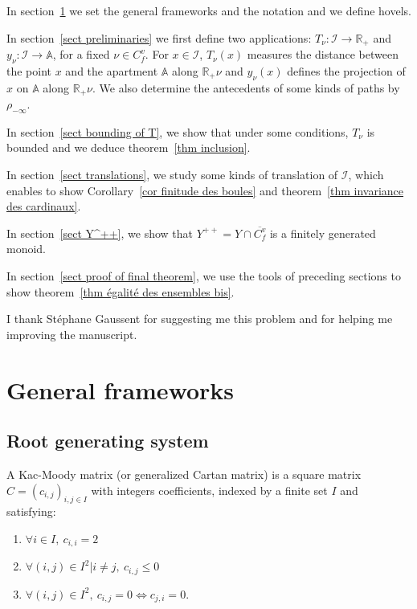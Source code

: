 \documentclass[12pt]{article}
\theoremstyle{plain}
\theoremstyle{definition}
\newcommand{\R}{\mathbb{R}}
\newcommand{\A}{\mathbb{A}}
\newcommand{\I}{\mathcal{I}}
\begin{document}
In section~\ref{sect general frameworks} we set the general frameworks and the notation and we define hovels.

 In section~\ref{sect preliminaries} we first define two applications: $T_\nu:\I\rightarrow\R_+$ and $y_\nu:\I\rightarrow \A$, for a fixed $\nu\in C_f^v$. For $x\in\I$, $T_\nu(x)$ measures the distance between the point $x$ and the apartment $\A$ along $\R_+\nu$ and $y_\nu(x)$ defines the projection of $x$ on $\A$ along $\R_+\nu$. We also determine the antecedents of some kinds of paths by $\rho_{-\infty}$. 
 
 In section~\ref{sect bounding of T}, we show that under some conditions, $T_\nu$ is bounded and we deduce theorem~\ref{thm inclusion}. 
 
 In section~\ref{sect translations}, we study some kinds of translation of $\I$, which enables to show Corollary~\ref{cor finitude des boules} and theorem~\ref{thm invariance des cardinaux}.
 
 In section~\ref{sect Y^++}, we show that $Y^{++}=Y\cap \overline{C_f^v}$ is a finitely generated monoid.
 
 In section~\ref{sect proof of final theorem}, we use the tools of preceding sections to show theorem~\ref{thm égalité des ensembles bis}. 

\vspace{3mm}

I thank Stéphane Gaussent for suggesting me this problem and for helping me improving the manuscript.


\section{General frameworks}\label{sect general frameworks}
\subsection{Root generating system}
A Kac-Moody matrix (or generalized Cartan matrix) is a square matrix $C=(c_{i,j})_{i,j\in I}$ with integers coefficients, indexed by  a finite set $I$ and satisfying: 
\begin{enumerate}
\item $\forall i\in I,\ c_{i,i}=2$

\item $\forall (i,j)\in I^2|i \neq j,\ c_{i,j}\leq 0$

\item $\forall (i,j)\in I^2,\ c_{i,j}=0 \Leftrightarrow c_{j,i}=0$.
\end{enumerate}
\end{document}
